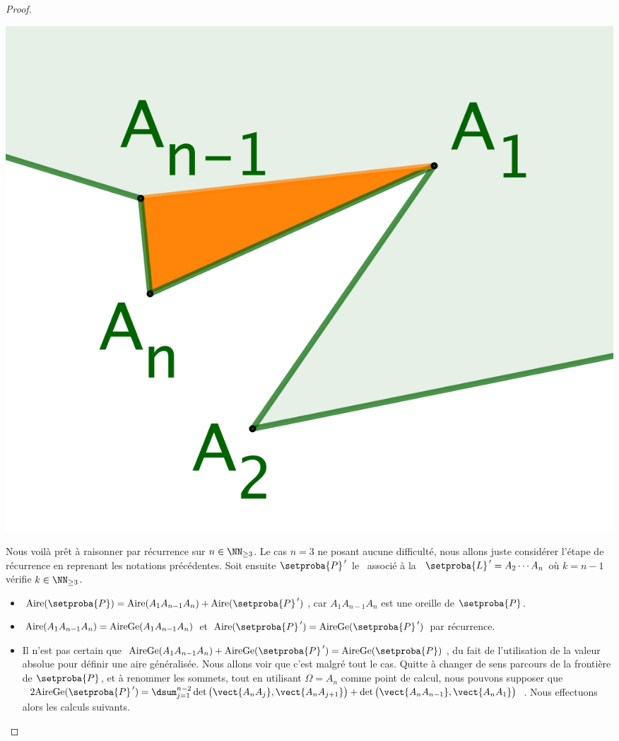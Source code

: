 \begin{proof}
    
    \begin{center}
        \includegraphics[scale=.4]{content/polygon/sufficient-cond/triangulation-proof.png}
    \end{center}
    
    
    Nous voilà prêt à raisonner par récurrence sur $n \in \NN_{\geq3}$.
    Le cas $n = 3$ ne posant aucune difficulté, nous allons juste considérer l'étape de récurrence en reprenant les notations précédentes.
    Soit ensuite
    $\setproba{P}^{\,\prime}$ le \kgone\ associé à la \kline\ $\setproba{L}^{\,\prime} = A_2 \cdots A_n$ où $k = n-1$ vérifie $k \in \NN_{\geq3}$.
    
    \begin{itemize}
    	\item $\area{\setproba{P}} = \area{A_1 A_{n-1} A_n}  +  \area{\setproba{P}^{\,\prime}}$, 
		car $A_1 A_{n-1} A_n$ est une oreille de $\setproba{P}$.


    	\item $\mathrm{Aire}(A_1 A_{n-1} A_n) = \mathrm{AireGe}(A_1 A_{n-1} A_n)$ et $\area{\setproba{P}^{\,\prime}} = \garea{\setproba{P}^{\,\prime}}$ 
		par récurrence.


    	\item Il n'est pas certain que $\garea{A_1 A_{n-1} A_n} + \garea{\setproba{P}^{\,\prime}} = \garea{\setproba{P}}$,
		du fait de l'utilisation de la valeur absolue pour définir une aire généralisée. Nous allons voir que c'est malgré tout le cas. 
		Quitte à changer de sens parcours de la frontière de $\setproba{P}$, et à renommer les sommets, 
		tout en utilisant $\Omega = A_n$ comme point de calcul,
		nous pouvons supposer que 
		$2 \garea{\setproba{P}^{\,\prime}}
		= \dsum_{j=1}^{n-2} \det \big( \vect{A_n A_j} , \vect{A_n A_{j + 1}} \big) 
		+ \det \big( \vect{A_n A_{n-1}} , \vect{A_n A_1} \big)$.
		Nous effectuons alors les calculs suivants.


\end{itemize}
\end{proof}
